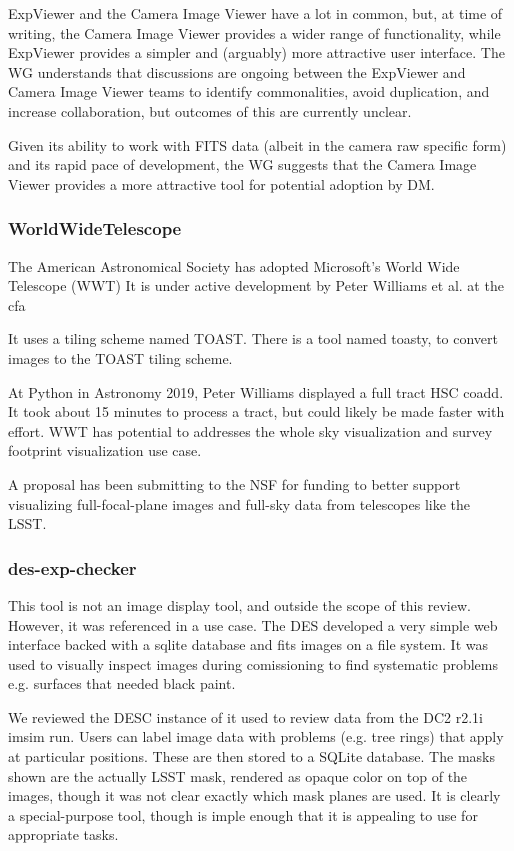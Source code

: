 ExpViewer and the Camera Image Viewer have a lot in common, but, at time of writing, the Camera Image Viewer provides a wider range of functionality, while ExpViewer provides a simpler and (arguably) more attractive user interface.
The WG understands that discussions are ongoing between the ExpViewer and Camera Image Viewer teams to identify commonalities, avoid duplication, and increase collaboration, but outcomes of this are currently unclear.

Given its ability to work with FITS data (albeit in the camera raw specific form) and its rapid pace of development, the WG suggests that the Camera Image Viewer provides a more attractive tool for potential adoption by DM.

\subsubsection{WorldWideTelescope}

The American Astronomical Society has adopted Microsoft's World Wide Telescope (WWT)
It is under active development by Peter Williams et al. at the cfa

It uses a tiling scheme named TOAST.
There is a tool named toasty, to convert images to the TOAST tiling scheme. 

At Python in Astronomy 2019,  Peter Williams displayed a full tract HSC coadd.
It took about 15 minutes to process a tract, but could likely be made faster with effort.
WWT has potential to addresses the whole sky visualization and survey footprint visualization use case. 

A proposal has been submitting to the NSF for funding to better support visualizing full-focal-plane images and full-sky data from telescopes like the LSST.

\subsubsection{des-exp-checker}

This tool is not an image display tool, and outside the scope of this review.
However, it was referenced in a use case.
The DES developed a very simple web interface backed with a sqlite database and fits images on a file system.
It was used to visually inspect images during comissioning to find systematic problems e.g. surfaces that needed black paint.

We reviewed the DESC instance of it used to review data from the  DC2 r2.1i imsim run.
Users can label image data with problems (e.g. tree rings) that apply at particular positions.
These are then stored to a SQLite database.
The masks shown are the actually LSST mask, rendered as opaque color on top of the images, though it was not clear exactly which mask planes are used.
It is clearly a special-purpose tool, though is imple enough that it is appealing to use for appropriate tasks.

